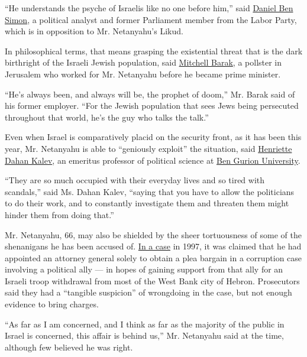 ``He understands the psyche of Israelis like no one before him,'' said
\href{https://www.knesset.gov.il/mk/eng/mk_eng.asp?mk_individual_id_t=836}{Daniel
Ben}
\href{https://www.knesset.gov.il/mk/eng/mk_eng.asp?mk_individual_id_t=836}{Simon},
a political analyst and former Parliament member from the Labor Party,
which is in opposition to Mr. Netanyahu's Likud.

In philosophical terms, that means grasping the existential threat that
is the dark birthright of the Israeli Jewish population, said
\href{http://www.keevoon.com/about.html}{Mitchell Barak}, a pollster in
Jerusalem who worked for Mr. Netanyahu before he became prime minister.

``He's always been, and always will be, the prophet of doom,'' Mr. Barak
said of his former employer. ``For the Jewish population that sees Jews
being persecuted throughout that world, he's the guy who talks the
talk.''

Even when Israel is comparatively placid on the security front, as it
has been this year, Mr. Netanyahu is able to ``geniously exploit'' the
situation, said
\href{http://bgu.academia.edu/\%D7\%94\%D7\%A0\%D7\%A8\%D7\%99\%D7\%99\%D7\%98\%D7\%93\%D7\%94\%D7\%90\%D7\%9F\%D7\%9B\%D7\%9C\%D7\%91}{Henriette
Dahan Kalev}, an emeritus professor of political science at
\href{http://in.bgu.ac.il/en/Pages/default.aspx}{Ben Gurion University}.

``They are so much occupied with their everyday lives and so tired with
scandals,'' said Ms. Dahan Kalev, ``saying that you have to allow the
politicians to do their work, and to constantly investigate them and
threaten them might hinder them from doing that.''

Mr. Netanyahu, 66, may also be shielded by the sheer tortuousness of
some of the shenanigans he has been accused of.
\href{http://www.nytimes3xbfgragh.onion/1997/04/21/world/netanyahu-avoids-criminal-charges-in-scandal-inquiry.html}{In
a case} in 1997, it was claimed that he had appointed an attorney
general solely to obtain a plea bargain in a corruption case involving a
political ally --- in hopes of gaining support from that ally for an
Israeli troop withdrawal from most of the West Bank city of Hebron.
Prosecutors said they had a ``tangible suspicion'' of wrongdoing in the
case, but not enough evidence to bring charges.

``As far as I am concerned, and I think as far as the majority of the
public in Israel is concerned, this affair is behind us,'' Mr. Netanyahu
said at the time, although few believed he was right.

